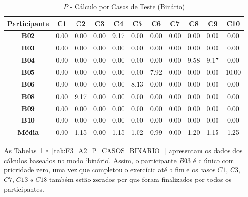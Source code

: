 \begin{table}[htbp]
	\centering
	\caption{$P$ - Cálculo por Casos de Teste (Binário)}
\begin{tabular}{|c|c|c|c|c|c|c|c|c|c|c|}
	\hline
	\rowcolor[HTML]{D9D9D9} 
	\cellcolor[HTML]{D0CECE}\textbf{Participante} & \textbf{C1} & \textbf{C2} & \textbf{C3} & \textbf{C4} & \textbf{C5} & \textbf{C6} & \textbf{C7} & \textbf{C8} & \textbf{C9} & \textbf{C10} \\ \hline
	\textbf{B02} & 0.00 & 0.00 & 0.00 & 9.17 & 0.00 & 0.00 & 0.00 & 0.00 & 0.00 & 0.00 \\ \hline
	\rowcolor[HTML]{F2F2F2} 
	\textbf{B03} & 0.00 & 0.00 & 0.00 & 0.00 & 0.00 & 0.00 & 0.00 & 0.00 & 0.00 & 0.00 \\ \hline
	\textbf{B04} & 0.00 & 0.00 & 0.00 & 0.00 & 0.00 & 0.00 & 0.00 & 9.58 & 9.17 & 0.00 \\ \hline
	\rowcolor[HTML]{F2F2F2} 
	\textbf{B05} & 0.00 & 0.00 & 0.00 & 0.00 & 0.00 & 7.92 & 0.00 & 0.00 & 0.00 & 10.00 \\ \hline
	\textbf{B06} & 0.00 & 0.00 & 0.00 & 0.00 & 8.13 & 0.00 & 0.00 & 0.00 & 0.00 & 0.00 \\ \hline
	\rowcolor[HTML]{F2F2F2} 
	\textbf{B08} & 0.00 & 9.17 & 0.00 & 0.00 & 0.00 & 0.00 & 0.00 & 0.00 & 0.00 & 0.00 \\ \hline
	\textbf{B09} & 0.00 & 0.00 & 0.00 & 0.00 & 0.00 & 0.00 & 0.00 & 0.00 & 0.00 & 0.00 \\ \hline
	\rowcolor[HTML]{F2F2F2} 
	\textbf{B10} & 0.00 & 0.00 & 0.00 & 0.00 & 0.00 & 0.00 & 0.00 & 0.00 & 0.00 & 0.00 \\ \hline
	\rowcolor[HTML]{D0CECE} 
	\textbf{Média} & 0.00 & 1.15 & 0.00 & 1.15 & 1.02 & 0.99 & 0.00 & 1.20 & 1.15 & 1.25 \\ \hline
\end{tabular}
	\label{tab:F3_A2_P_CASOS_BINARIO}
\end{table}

As Tabelas~\ref{tab:F3_A2_P_CASOS_BINARIO} e~\ref{tab:F3_A2_P_CASOS_BINARIO_} apresentam os dados dos cálculos baseados no modo `binário'. Assim, o participante $B03$ é o único com prioridade zero, uma vez que completou o exercício até o fim e os casos $C1$, $C3$, $C7$, $C13$ e $C18$ também estão zerados por que foram finalizados por todos os participantes.

